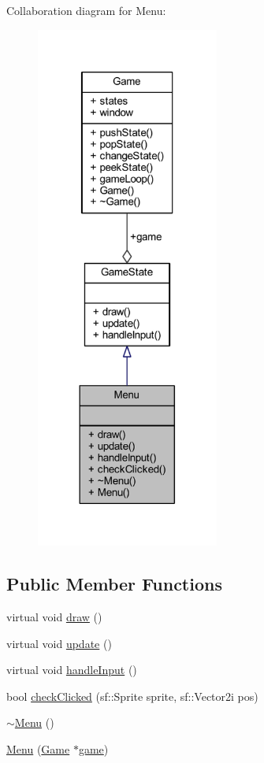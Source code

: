 Collaboration diagram for Menu\+:
\nopagebreak
\begin{figure}[H]
\begin{center}
\leavevmode
\includegraphics[width=170pt]{class_menu__coll__graph}
\end{center}
\end{figure}
\subsection*{Public Member Functions}
\begin{DoxyCompactItemize}
\item 
virtual void \hyperlink{class_menu_a2cd7ab9901a8f42a3ae977d0774398a6}{draw} ()
\item 
virtual void \hyperlink{class_menu_a8446e8a1e56e9cf1db93790067510a61}{update} ()
\item 
virtual void \hyperlink{class_menu_a28296c3978c880ea9288fc97a869795d}{handle\+Input} ()
\item 
bool \hyperlink{class_menu_a1b4d7af621c036afa3d9758e8accbc16}{check\+Clicked} (sf\+::\+Sprite sprite, sf\+::\+Vector2i pos)
\item 
\hyperlink{class_menu_a831387f51358cfb88cd018e1777bc980}{$\sim$\+Menu} ()
\item 
\hyperlink{class_menu_a91ec4975ad2aced80cd524a179dd7af1}{Menu} (\hyperlink{class_game}{Game} $\ast$\hyperlink{class_game_state_a355a79415b9ef63c2aec1448a99f6e71}{game})
\end{DoxyCompactItemize}
